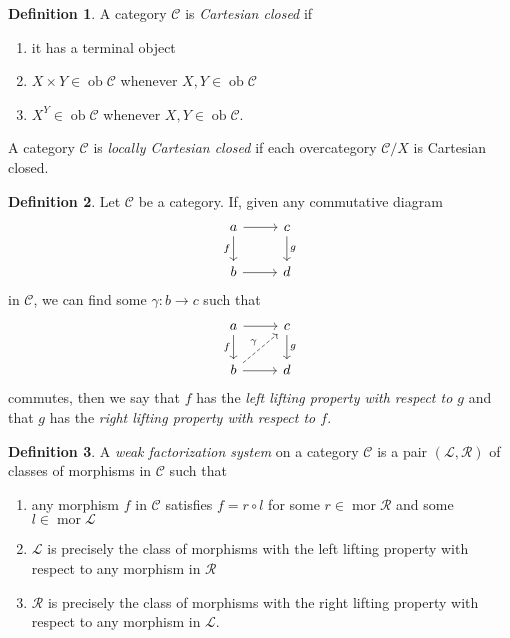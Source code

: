 \documentclass[10pt,letterpaper,cm]{nupset}
\theoremstyle{definition}
\newtheorem*{definition}{Definition}
\newcommand{\1}{\mathbf{1}}
\renewcommand{\c}{\mathscr{C}}
\newcommand{\0}{\vec 0}
\DeclareMathOperator{\ob}{ob}
\DeclareMathOperator{\mor}{mor}
\begin{document}
\begin{definition}
A category $\c$ is \textit{Cartesian closed} if
\begin{enumerate}
\item it has a terminal object
\item $X \times Y \in \ob{\c}$ whenever $X,Y\in \ob{\c}$
\item $X^Y \in \ob{\c}$ whenever $X,Y \in \ob{\c}$.
\end{enumerate}
A category $\c$ is \textit{locally Cartesian closed} if each overcategory $\c/X$ is Cartesian closed. 
\end{definition}

\begin{definition}
Let $\c$ be a category. If, given any commutative diagram
\[
\begin{tikzcd}
a \arrow[r] \arrow[d, "f"'] & c \arrow[d, "g"] \\
b \arrow[r] & d
\end{tikzcd}
\] in $\c$, we can find some $\gamma : b \to c$ such that
\[
\begin{tikzcd}
a \arrow[r] \arrow[d, "f"'] & c \arrow[d, "g"] \\
b \arrow[r] \arrow[ru, "\gamma", dashed] & d
\end{tikzcd}
\] commutes, then we say that $f$ has the \textit{left lifting property with respect to $g$} and that $g$ has the  \textit{right lifting property with respect to $f$}.
\end{definition}

\begin{definition}
A \textit{weak factorization system} on a category $\c$ is a pair $(\mathscr{L}, \mathscr{R})$ of classes of morphisms in $\c$ such that
\begin{enumerate}
\item any morphism $f$ in $\c$ satisfies $f = r \circ l$ for some $r\in \mor{\mathscr{R}}$ and some $l\in \mor{\mathscr{L}}$
\item $\mathscr{L}$ is precisely the class of morphisms with the left lifting property with respect to any morphism in $\mathscr{R}$
\item $\mathscr{R}$ is precisely the class of morphisms with the right  lifting property with respect to any morphism in $\mathscr{L}$.
\end{enumerate}
\end{definition}
\end{document}
